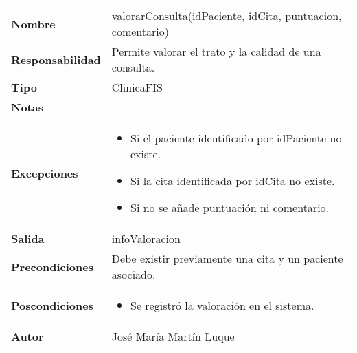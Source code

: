 \documentclass[11pt,a4paper]{article}
\newenvironment{itemizenomargins}
    {\begin{minipage}[t]{1\linewidth}\begin{itemize}}
    {\end{itemize}\end{minipage}}
\begin{document}
\begin{table}[H]
	\centering
	\label{anular-cita}
	\begin{tabularx}{\textwidth}{l|X}
    \textbf{Nombre}          & valorarConsulta(idPaciente, idCita, puntuacion, comentario)\\
		\textbf{Responsabilidad} & Permite valorar el trato y la calidad de una consulta. \\
		\textbf{Tipo}            & ClinicaFIS \\
		\textbf{Notas}           &  \\
		\textbf{Excepciones}     & 
		\begin{itemizenomargins}
			\item Si el paciente identificado por idPaciente no existe.
      \item Si la cita identificada por idCita no existe.
      \item Si no se añade puntuación ni comentario.
		\end{itemizenomargins} \\
		\textbf{Salida}          &  infoValoracion\\
		\textbf{Precondiciones}  &  Debe existir previamente una cita y un paciente asociado.\\
		\textbf{Poscondiciones}  & 
		\begin{itemizenomargins}
			\item Se registró la valoración en el sistema.
		\end{itemizenomargins} \\
		\textbf{Autor}			 & José María Martín Luque
	\end{tabularx}
\end{table}
\end{document}
